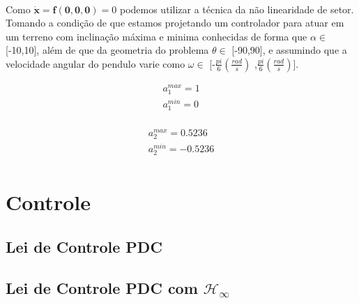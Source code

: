 \documentclass[a4paper,10pt]{article}
\begin{document}
\paragraph{} Como $\dot{\bm{x}} = \bm{f(0,0,0)} = 0$ podemos utilizar a técnica da não linearidade de setor. Tomando a condição de que estamos projetando um controlador para atuar em um terreno com inclinação máxima e minima conhecidas de forma que $\alpha \in$ [-10\textdegree ,10\textdegree], além de que da geometria do problema $\theta \in$ [-90\textdegree ,90\textdegree], e assumindo que a velocidade angular do pendulo varie como $\omega \in$ [-$\frac{pi}{6}(\frac{rad}{s})$ ,$\frac{pi}{6}(\frac{rad}{s})$].


\noindent \begin{minipage}{.25 \linewidth}
\begin{gather}
	a_{1}^{max} = 1 \\
	a_{1}^{min} = 0 \\	
\end{gather}
\end{minipage}
\hfill
 \begin{minipage}{.25 \linewidth}
	\begin{gather}
		a_{2}^{max} = 0.5236 \\
		a_{2}^{min} = -0.5236 \\	
	\end{gather}
\end{minipage}
\section{Controle}
\subsection{Lei de Controle PDC}
\subsection{Lei de Controle PDC com $\mathcal{H}_\infty$}
\end{document}
